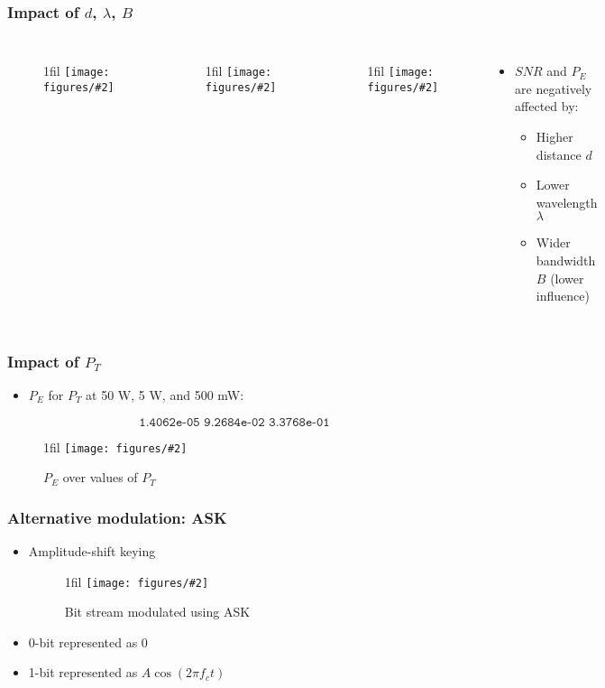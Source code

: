 \documentclass{beamer}
\makeatletter
\newcommand{\code}[1]{\texttt{#1}}
\newcommand*{\centerfloat}{%
  \parindent \z@
  \leftskip \z@ \@plus 1fil \@minus \textwidth
  \rightskip\leftskip
  \parfillskip \z@skip}
\newcommand{\fig}[3]{
  \begin{figure}[H]
  \centerfloat
    \texttt{[image: figures/\#2]}
    \caption{#3}
  \end{figure}
}
\newcommand{\figNoCapt}[2]{
  \begin{figure}[H]
  \centerfloat
    \texttt{[image: figures/\#2]}
  \end{figure}
}
\makeatother
\begin{document}
\begin{frame}
	\frametitle{Impact of $d$, $\lambda$, $B$}
	\begin{columns}
			\figNoCapt{2.75cm}{d_lambda.png}
			\figNoCapt{2.75cm}{lambda_b.png}
			\figNoCapt{2.75cm}{d_b.png}
			\begin{itemize}
				\item $SNR$ and $P_E$ are negatively affected by:
				\begin{itemize}
					\item Higher distance $d$
					\item Lower wavelength $\lambda$
					\item Wider bandwidth $B$ (lower influence)
				\end{itemize}
			\end{itemize}
	\end{columns}
\end{frame}

\begin{frame}
	\frametitle{Impact of $P_T$}
	\begin{itemize}
		\item $P_E$ for $P_T$ at 50 W, 5 W, and 500 mW:
	\end{itemize}
	\begin{equation}
		\code{1.4062e-05   9.2684e-02   3.3768e-01}
	\end{equation}
	\fig{4cm}{pe_over_pt.png}{$P_E$ over values of $P_T$}
\end{frame}

\begin{frame}
	\frametitle{Alternative modulation: ASK}
	\begin{itemize}
		\item Amplitude-shift keying
		\fig{2.5cm}{ask.png}{Bit stream modulated using ASK}
		\item 0-bit represented as 0
		\item 1-bit represented as $A\cos(2 \pi f_c t)$
	\end{itemize}
\end{frame}
\end{document}
